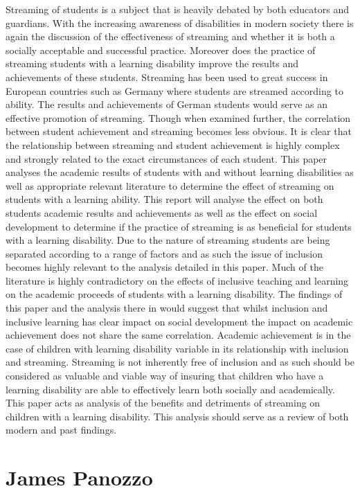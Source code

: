 \documentclass[twoside,14pt,a4paper,notitlepage]{memoir}
\begin{document}
Streaming of students is a subject that is heavily debated by both educators and guardians. With the increasing awareness of disabilities in modern society there is again the discussion of the effectiveness of streaming and whether it is both a socially acceptable and successful practice. Moreover does the practice of streaming students with a learning disability improve the results and achievements of these students. Streaming has been used to great success in European countries such as Germany where students are streamed according to ability. The results and achievements of German students would serve as an effective promotion of streaming. Though when examined further, the correlation between student achievement and streaming becomes less obvious. It is clear that the relationship between streaming and student achievement is highly complex and strongly related to the exact circumstances of each student. This paper analyses the academic results of students with and without learning disabilities as well as appropriate relevant literature to determine the effect of streaming on students with a learning ability. This report will analyse the effect on both students academic results and achievements as well as the effect on social development to determine if the practice of streaming is as beneficial for students with a learning disability. Due to the nature of streaming students are being separated according to a range of factors and as such the issue of inclusion becomes highly relevant to the analysis detailed in this paper. Much of the literature is highly contradictory on the effects of inclusive teaching and learning on the academic proceeds of students with a learning disability. The findings of this paper and the analysis there in would suggest that whilst inclusion and inclusive learning has clear impact on social development the impact on academic achievement does not share the same correlation. Academic achievement is in the case of children with learning disability variable in its relationship with inclusion and streaming. Streaming is not inherently free of inclusion and as such should be considered as valuable and viable way of insuring that children who have a learning disability are able to effectively learn both socially and academically. This paper acts as analysis of the benefits and detriments of streaming on children with a learning disability. This analysis should serve as a review of both modern and past findings. 

\section*{James Panozzo}
\end{document}
